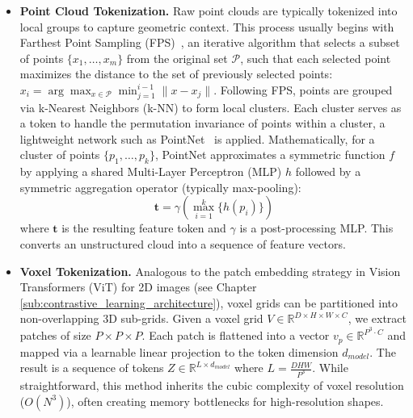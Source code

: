 \documentclass[../../book-main.tex]{subfiles}
\begin{document}
\begin{itemize}
\item \textbf{Point Cloud Tokenization.}
    Raw point clouds are typically tokenized into local groups to capture
    geometric context. This process usually begins with Farthest
    Point Sampling (FPS)~\cite{eldar1997farthest},
    an iterative algorithm that selects a subset of points $\{x_1, \dots, x_m\}$
    from the original set $\mathcal{P}$, such that each selected point maximizes
    the distance to the set of previously selected points:
    $x_{i} = \arg\max_{x \in \mathcal{P}} \min_{j=1}^{i-1} \|x - x_j\|$.
    Following FPS, points are grouped via k-Nearest Neighbors (k-NN)
    to form local clusters.
    Each cluster serves as a token to handle the permutation
    invariance of points
    within a cluster, a lightweight network such as
    PointNet~\cite{qi2017pointnet} is applied.
    Mathematically, for a cluster of points $\{p_1, \dots, p_k\}$,
    PointNet approximates a symmetric function $f$ by applying a shared
    Multi-Layer Perceptron (MLP) $h$ followed by a symmetric
    aggregation operator (typically max-pooling):
    \begin{equation}
        \boldsymbol{t} = \gamma \left( \max_{i=1}^k \{ h(p_i) \} \right)
    \end{equation}
    where $\boldsymbol{t}$ is the resulting feature token and
    $\gamma$ is a post-processing MLP.
    This converts an unstructured cloud into a sequence of feature vectors.



\item \textbf{Voxel Tokenization.}
    Analogous to the patch embedding strategy in Vision Transformers
    (ViT) for 2D images (see Chapter
    \ref{sub:contrastive_learning_architecture}), voxel grids can be
    partitioned into non-overlapping 3D sub-grids. Given a voxel grid
    $V \in \mathbb{R}^{D \times H \times W \times C}$, we extract
    patches of size $P \times P \times P$. Each patch is flattened
    into a vector $v_p \in \mathbb{R}^{P^3 \cdot C}$ and mapped via a
    learnable linear projection to the token dimension $d_{model}$.
    The result is a sequence of tokens $Z \in \mathbb{R}^{L \times
    d_{model}}$ where $L = \frac{DHW}{P^3}$. While straightforward,
    this method inherits the cubic complexity of voxel resolution
    ($O(N^3)$), often creating memory bottlenecks for high-resolution shapes.


\end{itemize}
\end{document}
